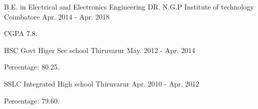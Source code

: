 

\begin{cventries}

  \cventry
    {B.E. in Electrical and Electronics Engineering} %
    {DR. N.G.P Institute of technology} %
    {Coimbatore} %
    {Apr. 2014 - Apr. 2018} %
    {
      \begin{cvitems} %
        \item {CGPA 7.8.}
      \end{cvitems}
    }
    \cventry
    {HSC} %
    {Govt Higer Sec school} %
    {Thiruvarur} %
    {May. 2012 - Apr. 2014} %
    {
      \begin{cvitems} %
        \item {Percentage: 80.25.}
      \end{cvitems}
    }
    \cventry
    {SSLC} %
    {Integrated High school} %
    {Thiruvarur} %
    {Apr. 2010 - Apr. 2012} %
    {
      \begin{cvitems} %
        \item {Percentage: 79.60.}
      \end{cvitems}
    }

\end{cventries}
